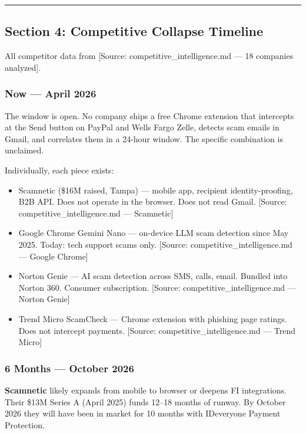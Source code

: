 \documentclass[11pt, letterpaper]{article}
\newcommand{\source}[1]{\textcolor{citation}{[Source: #1]}}
\begin{document}
  \vspace{12pt}
  \hrule
  \vspace{12pt}

  \subsection{Section 4: Competitive Collapse Timeline}

  All competitor data from \source{competitive\_intelligence.md --- 18 companies analyzed}.

  \subsubsection{Now --- April 2026}

  The window is open. No company ships a free Chrome extension that intercepts at the Send button on PayPal and Wells Fargo Zelle, detects scam emails in Gmail, and correlates them in a 24-hour window. The specific combination is unclaimed.

  Individually, each piece exists:
  \begin{itemize}[nosep]
    \item Scamnetic (\$16M raised, Tampa) --- mobile app, recipient identity-proofing, B2B API. Does not operate in the browser. Does not read Gmail. \source{competitive\_intelligence.md --- Scamnetic}
    \item Google Chrome Gemini Nano --- on-device LLM scam detection since May 2025. Today: tech support scams only. \source{competitive\_intelligence.md --- Google Chrome}
    \item Norton Genie --- AI scam detection across SMS, calls, email. Bundled into Norton 360. Consumer subscription. \source{competitive\_intelligence.md --- Norton Genie}
    \item Trend Micro ScamCheck --- Chrome extension with phishing page ratings. Does not intercept payments. \source{competitive\_intelligence.md --- Trend Micro}
  \end{itemize}

  \subsubsection{6 Months --- October 2026}

  \textbf{Scamnetic} likely expands from mobile to browser or deepens FI integrations. Their \$13M Series A (April 2025) funds 12--18 months of runway. By October 2026 they will have been in market for 10 months with IDeveryone Payment Protection.
\end{document}
